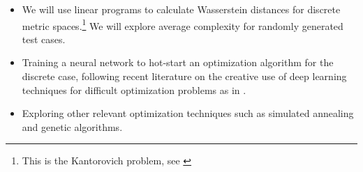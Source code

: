 \documentclass{amsart}
\begin{document}
\begin{itemize}

\item We will use linear programs to calculate Wasserstein distances for
discrete metric spaces.\footnote{This is the Kantorovich problem, see \cite{peyre2017computational}} We will explore average complexity for randomly
generated test cases.

\item Training a neural network to hot-start an optimization algorithm for the
discrete case, following recent literature on the creative use of deep learning techniques for difficult optimization problems as in \cite{dutting2017optimal}.

\item Exploring other relevant optimization techniques such as simulated
annealing and genetic algorithms.

\end{itemize}




\end{document}

